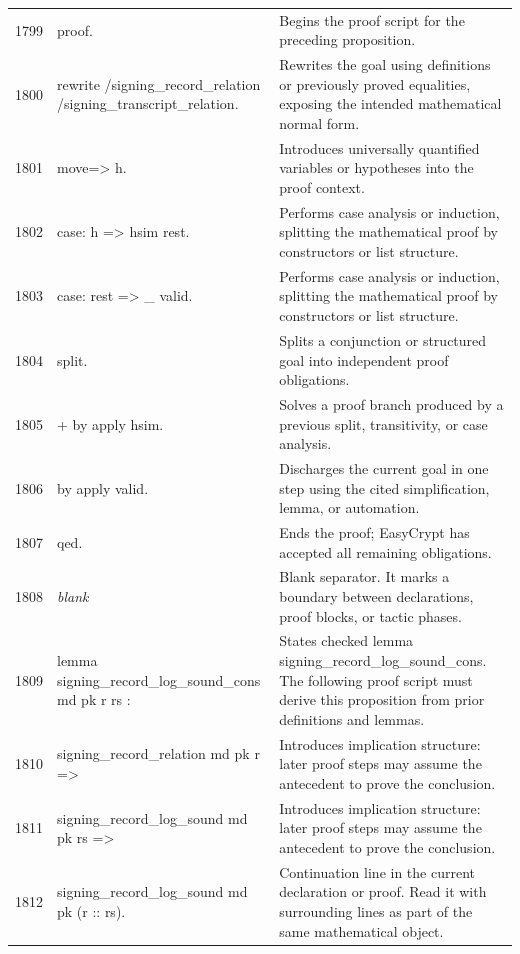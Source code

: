 \documentclass[10pt]{article}
\begin{document}
\begin{longtable}{r L{0.53\textwidth} L{0.37\textwidth}}
1799 & {\ttfamily\scriptsize proof.} & Begins the proof script for the preceding proposition. \\
1800 & {\ttfamily\scriptsize rewrite /signing\_record\_relation /signing\_transcript\_relation.} & Rewrites the goal using definitions or previously proved equalities, exposing the intended mathematical normal form. \\
1801 & {\ttfamily\scriptsize move=> h.} & Introduces universally quantified variables or hypotheses into the proof context. \\
1802 & {\ttfamily\scriptsize case: h => hsim rest.} & Performs case analysis or induction, splitting the mathematical proof by constructors or list structure. \\
1803 & {\ttfamily\scriptsize case: rest => \_ valid.} & Performs case analysis or induction, splitting the mathematical proof by constructors or list structure. \\
1804 & {\ttfamily\scriptsize split.} & Splits a conjunction or structured goal into independent proof obligations. \\
1805 & {\ttfamily\scriptsize + by apply hsim.} & Solves a proof branch produced by a previous split, transitivity, or case analysis. \\
1806 & {\ttfamily\scriptsize by apply valid.} & Discharges the current goal in one step using the cited simplification, lemma, or automation. \\
1807 & {\ttfamily\scriptsize qed.} & Ends the proof; EasyCrypt has accepted all remaining obligations. \\
1808 & {\ttfamily\scriptsize \emph{blank}} & Blank separator.  It marks a boundary between declarations, proof blocks, or tactic phases. \\
1809 & {\ttfamily\scriptsize lemma signing\_record\_log\_sound\_cons md pk r rs :} & States checked lemma signing\_record\_log\_sound\_cons.  The following proof script must derive this proposition from prior definitions and lemmas. \\
1810 & {\ttfamily\scriptsize   signing\_record\_relation md pk r =>} & Introduces implication structure: later proof steps may assume the antecedent to prove the conclusion. \\
1811 & {\ttfamily\scriptsize   signing\_record\_log\_sound md pk rs =>} & Introduces implication structure: later proof steps may assume the antecedent to prove the conclusion. \\
1812 & {\ttfamily\scriptsize   signing\_record\_log\_sound md pk (r :: rs).} & Continuation line in the current declaration or proof.  Read it with surrounding lines as part of the same mathematical object. \\

\end{longtable}
\end{document}
